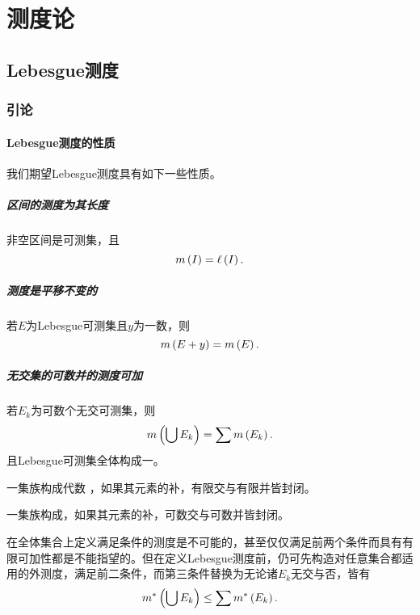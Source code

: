 \documentclass{ctexrep}
\begin{document}
\fi


\chapter{测度论}
  \section{Lebesgue测度}
  \subsection{引论}
  \subsubsection*{Lebesgue测度的性质}
  我们期望Lebesgue测度具有如下一些性质。
  \paragraph{区间的测度为其长度}非空区间是可测集，且
  \[ m\left(I\right)=\ell\left(I\right). \]
  \paragraph{测度是平移不变的}若$E$为Lebesgue可测集且$y$为一数，则
  \[ m\left(E+y\right)=m\left(E\right). \]
  \paragraph{无交集的可数并的测度可加}$若E_k$为可数个无交可测集，则
  \[ m\left(\bigcup E_k\right) = \sum m\left(E_k\right). \]
  且Lebesgue可测集全体构成一\siga。
  \begin{definition}
    一集族构成代数 ，如果其元素的补，有限交与有限并皆封闭。
  \end{definition}
  \begin{definition}
    一集族构成\siga ，如果其元素的补，可数交与可数并皆封闭。
  \end{definition}
  在全体集合上定义满足条件的测度是不可能的，甚至仅仅满足前两个条件而具有有限可加性都是不能指望的。但在定义Lebesgue测度前，仍可先构造对任意集合都适用的外测度，满足前二条件，而第三条件替换为无论诸$E_k$无交与否，皆有
  \[ m^*\left(\bigcup E_k\right) \le \sum m^*\left(E_k\right). \]
\end{document}
